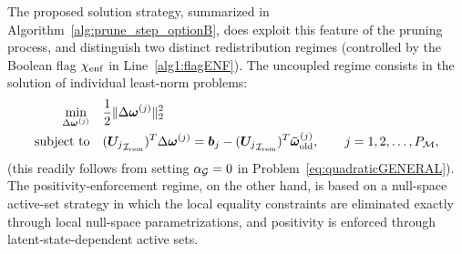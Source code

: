 \documentclass[preprint,10pt]{elsarticle}  %
\begin{document}
The proposed solution strategy, summarized in Algorithm~\ref{alg:prune_step_optionB}, does exploit this  feature of the pruning
process, and distinguish two distinct    redistribution regimes (controlled by
the Boolean flag \(\chi_{\mathrm{enf}}\) in Line~\ref{alg1:flagENF}). The uncoupled regime consists in the solution of individual least-norm problems:
\begin{equation}
\label{eq:smallproblems}
\begin{aligned}
\min_{\Delta\bm{\omega}^{(j)}}
\quad &
\frac12
\|
\Delta\bm{\omega}^{(j)}
\|_2^2
\\
\text{subject to}
\quad &
({\bm{U}_{j}}_{\mathcal{I}_{\mathrm{rem}}})^T\Delta\bm{\omega}^{(j)}
=
\bm{b}_{j} - ({\bm{U}_{j}}_{\mathcal{I}_{\mathrm{rem}}})^T\bm{\bar{\omega}}^{(j)}_{\mathrm{old}},
\qquad
j=1,2,\ldots,P_{\mathcal{M}},
\end{aligned}
\end{equation}
(this readily follows from setting $\alpha_{\mathcal{G}} = 0$ in  Problem~\eqref{eq:quadraticGENERAL}). The
positivity-enforcement regime, on the other hand,  is  based on  a null-space active-set strategy in
which the local equality constraints are eliminated exactly through
local null-space parametrizations, and positivity  is enforced
through latent-state-dependent active sets.




%



%
%



\end{document}
